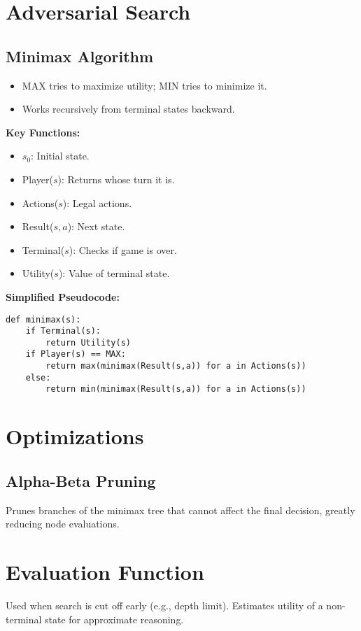 \section{Adversarial Search}

\subsection{Minimax Algorithm}
\begin{itemize}
    \item MAX tries to maximize utility; MIN tries to minimize it.
    \item Works recursively from terminal states backward.
\end{itemize}

\textbf{Key Functions:}
\begin{itemize}
    \item $s_0$: Initial state.
    \item Player($s$): Returns whose turn it is.
    \item Actions($s$): Legal actions.
    \item Result($s, a$): Next state.
    \item Terminal($s$): Checks if game is over.
    \item Utility($s$): Value of terminal state.
\end{itemize}

\textbf{Simplified Pseudocode:}
\begin{verbatim}
def minimax(s):
    if Terminal(s):
        return Utility(s)
    if Player(s) == MAX:
        return max(minimax(Result(s,a)) for a in Actions(s))
    else:
        return min(minimax(Result(s,a)) for a in Actions(s))
\end{verbatim}

\section{Optimizations}

\subsection{Alpha-Beta Pruning}
Prunes branches of the minimax tree that cannot affect the final decision, greatly reducing node evaluations.

\section{Evaluation Function}
Used when search is cut off early (e.g., depth limit).  
Estimates utility of a non-terminal state for approximate reasoning.


